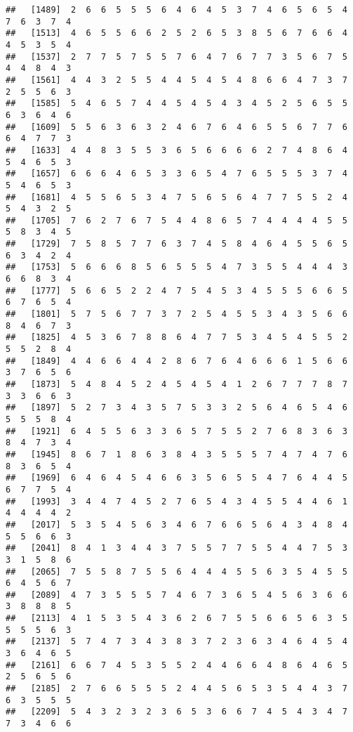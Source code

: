 \documentclass[
]{book}
\begin{document}
\begin{verbatim}
##   [1489]  2  6  6  5  5  5  6  4  6  4  5  3  7  4  6  5  6  5  4  7  6  3  7  4
##   [1513]  4  6  5  5  6  6  2  5  2  6  5  3  8  5  6  7  6  6  4  4  5  3  5  4
##   [1537]  2  7  7  5  7  5  5  7  6  4  7  6  7  7  3  5  6  7  5  4  4  8  4  3
##   [1561]  4  4  3  2  5  5  4  4  5  4  5  4  8  6  6  4  7  3  7  2  5  5  6  3
##   [1585]  5  4  6  5  7  4  4  5  4  5  4  3  4  5  2  5  6  5  5  6  3  6  4  6
##   [1609]  5  5  6  3  6  3  2  4  6  7  6  4  6  5  5  6  7  7  6  6  4  7  7  3
##   [1633]  4  4  8  3  5  5  3  6  5  6  6  6  6  2  7  4  8  6  4  5  4  6  5  3
##   [1657]  6  6  6  4  6  5  3  3  6  5  4  7  6  5  5  5  3  7  4  5  4  6  5  3
##   [1681]  4  5  5  6  5  3  4  7  5  6  5  6  4  7  7  5  5  2  4  5  4  3  2  5
##   [1705]  7  6  2  7  6  7  5  4  4  8  6  5  7  4  4  4  4  5  5  5  8  3  4  5
##   [1729]  7  5  8  5  7  7  6  3  7  4  5  8  4  6  4  5  5  6  5  6  3  4  2  4
##   [1753]  5  6  6  6  8  5  6  5  5  5  4  7  3  5  5  4  4  4  3  6  6  8  3  4
##   [1777]  5  6  6  5  2  2  4  7  5  4  5  3  4  5  5  5  6  6  5  6  7  6  5  4
##   [1801]  5  7  5  6  7  7  3  7  2  5  4  5  5  3  4  3  5  6  6  8  4  6  7  3
##   [1825]  4  5  3  6  7  8  8  6  4  7  7  5  3  4  5  4  5  5  2  5  5  2  8  4
##   [1849]  4  4  6  6  4  4  2  8  6  7  6  4  6  6  6  1  5  6  6  3  7  6  5  6
##   [1873]  5  4  8  4  5  2  4  5  4  5  4  1  2  6  7  7  7  8  7  3  3  6  6  3
##   [1897]  5  2  7  3  4  3  5  7  5  3  3  2  5  6  4  6  5  4  6  5  5  5  8  4
##   [1921]  6  4  5  5  6  3  3  6  5  7  5  5  2  7  6  8  3  6  3  8  4  7  3  4
##   [1945]  8  6  7  1  8  6  3  8  4  3  5  5  5  7  4  7  4  7  6  8  3  6  5  4
##   [1969]  6  4  6  4  5  4  6  6  3  5  6  5  5  4  7  6  4  4  5  6  7  7  5  4
##   [1993]  3  4  4  7  4  5  2  7  6  5  4  3  4  5  5  4  4  6  1  4  4  4  4  2
##   [2017]  5  3  5  4  5  6  3  4  6  7  6  6  5  6  4  3  4  8  4  5  5  6  6  3
##   [2041]  8  4  1  3  4  4  3  7  5  5  7  7  5  5  4  4  7  5  3  3  1  5  8  6
##   [2065]  7  5  5  8  7  5  5  6  4  4  4  5  5  6  3  5  4  5  5  6  4  5  6  7
##   [2089]  4  7  3  5  5  5  7  4  6  7  3  6  5  4  5  6  3  6  6  3  8  8  8  5
##   [2113]  4  1  5  3  5  4  3  6  2  6  7  5  5  6  6  5  6  3  5  5  5  5  6  3
##   [2137]  5  7  4  7  3  4  3  8  3  7  2  3  6  3  4  6  4  5  4  3  6  4  6  5
##   [2161]  6  6  7  4  5  3  5  5  2  4  4  6  6  4  8  6  4  6  5  2  5  6  5  6
##   [2185]  2  7  6  6  5  5  5  2  4  4  5  6  5  3  5  4  4  3  7  6  3  5  5  5
##   [2209]  5  4  3  2  3  2  3  6  5  3  6  6  7  4  5  4  3  4  7  7  3  4  6  6

\end{verbatim}
\end{document}
